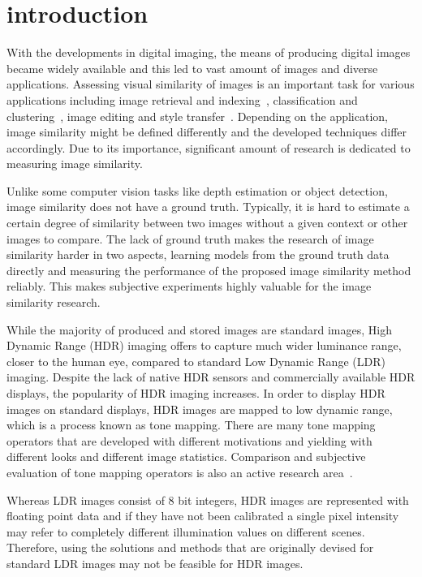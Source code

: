 \chapter{introduction}
\label{chp:b1}
With the developments in digital imaging, the means of producing digital images became widely available and this led to vast amount of images and diverse applications. Assessing visual similarity of images is an important task for various applications including image retrieval and indexing~\cite{liu2007survey}, classification and clustering~\cite{kleiman2016toward}, image editing and style transfer~\cite{rawat2018find}. Depending on the application, image similarity might be defined differently and the developed techniques differ accordingly. Due to its importance, significant amount of research is dedicated to measuring image similarity. 

Unlike some computer vision tasks like depth estimation or object detection, image similarity does not have a ground truth. Typically, it is hard to estimate a certain degree of similarity between two images without a given context or other images to compare. The lack of ground truth makes the research of image similarity harder in two aspects, learning models from the ground truth data directly and measuring the performance of the proposed image similarity method reliably. This makes subjective experiments highly valuable for the image similarity research.

While the majority of produced and stored images are standard images, High Dynamic Range (HDR) imaging offers to capture much wider luminance range, closer to the human eye, compared to standard Low Dynamic Range (LDR) imaging. Despite the lack of native HDR sensors and commercially available HDR displays, the popularity of HDR imaging increases. In order to display HDR images on standard displays, HDR images are mapped to low dynamic range, which is a process known as tone mapping. There are many tone mapping operators that are developed with different motivations and yielding with different looks and different image statistics. Comparison and subjective evaluation of tone mapping operators is also an active research area~\cite{kundu2017large, krasula2016preference}.

Whereas LDR images consist of 8 bit integers, HDR images are represented with floating point data and if they have not been calibrated a single pixel intensity may refer to completely different illumination values on different scenes. Therefore, using the solutions and methods that are originally devised for standard LDR images may not be feasible for HDR images.


